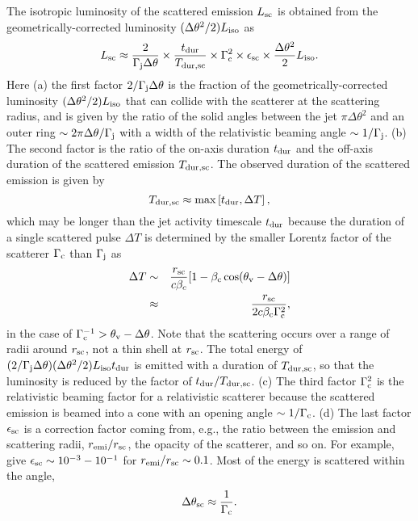 \documentclass{emulateapj}
\begin{document}
The isotropic luminosity of the scattered emission $L_{\rm sc}$ is 
obtained from the geometrically-corrected luminosity 
$(\Delta\theta^2/2)L_{\rm iso}$ as
\begin{equation}\label{eq:L_sc,iso}
L_{\rm sc} \approx \frac{2}{\Gamma_{\rm j}\Delta\theta}
\times\frac{t_{\rm dur}}{T_{\rm dur, sc}}\times\Gamma_{\rm c}^2
\times \epsilon_{\rm sc} \times \frac{\Delta\theta^2}{2} L_{\rm iso}.
\end{equation}
Here (a) the first factor $2/\Gamma_{\rm j}\Delta\theta$
is the fraction of the geometrically-corrected luminosity $(\Delta\theta^2/2)L_{\rm iso}$
that can collide with the scatterer at the scattering radius,
and is given by the ratio of the solid angles between the jet $\pi \Delta\theta^2$
and an outer ring $\sim 2\pi \Delta\theta/\Gamma_{\rm j}$
with a width of the relativistic beaming angle $\sim 1/\Gamma_{\rm j}$.
(b) The second factor is the ratio of the on-axis duration $t_{\rm dur}$ and
the off-axis duration of the scattered emission $T_{\rm dur,sc}$.
The observed duration of the scattered emission is given by
\begin{equation}\label{eq:T_sc,emi}
T_{\rm dur, sc} \approx \max\left[t_{\rm dur}, \Delta T \right], 
\end{equation}
which may be longer than the jet activity timescale $t_{\rm dur}$
because the duration of a single scattered pulse $\Delta T$ 
is determined by the smaller Lorentz factor of the scatterer $\Gamma_{\rm c}$ than $\Gamma_{\rm j}$ as
\begin{eqnarray}\label{eq:T_sc}
\Delta T &\sim& \frac{r_{\rm sc}}{c\beta_c}[1-\beta_{\rm c}\cos(\theta_{\rm v}-\Delta\theta)] \nonumber \\
&\approx& \frac{r_{\rm sc}}{2c\beta_{\rm c}\Gamma_{\rm c}^2},
\end{eqnarray}
in the case of $\Gamma_{\rm c}^{-1}>\theta_{\rm v}-\Delta\theta$.
Note that the scattering occurs over a range of radii around $r_{\rm sc}$,
not a thin shell at $r_{\rm sc}$.
The total energy of $(2/\Gamma_{\rm j}\Delta\theta)(\Delta\theta^2/2)L_{\rm iso} t_{\rm dur}$ 
is emitted with a duration of $T_{\rm dur, sc}$,
so that the luminosity is reduced by the factor of $t_{\rm dur}/T_{\rm dur,sc}$.
(c) The third factor $\Gamma_{\rm c}^2$ is the relativistic beaming factor 
for a relativistic scatterer because 
the scattered emission is beamed into a cone with an opening angle $\sim 1/\Gamma_{\rm c}$.  
(d) The last factor $\epsilon_{\rm sc}$ is a correction factor coming from, e.g.,
the ratio between the emission and scattering radii, $r_{\rm emi}/r_{\rm sc}$,
the opacity of the scatterer, and so on.
For example, \citet{1999ApJ...521L.117E} give $\epsilon_{\rm sc}\sim10^{-3}-10^{-1}$ for
$r_{\rm emi}/r_{\rm sc}\sim0.1$. 
Most of the energy is scattered within the angle, 
\begin{equation}\label{eq:opening}
\Delta \theta_{\rm sc} \approx \frac{1}{\Gamma_{\rm c}}.
\end{equation}
\end{document}
